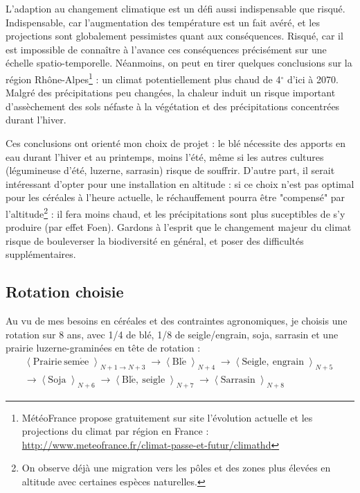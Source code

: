 \documentclass{book}
\begin{document}
L'adaption au changement climatique est un défi aussi indispensable que risqué. Indispensable, car l'augmentation des température est un fait avéré, et les projections sont globalement pessimistes quant aux conséquences. Risqué, car il est impossible de connaître à l'avance ces conséquences précisément sur une échelle spatio-temporelle. Néanmoins, on peut en tirer quelques conclusions sur la région Rhône-Alpes\footnote{MétéoFrance propose gratuitement sur site l'évolution actuelle et les projections du climat par région en France : \url{http://www.meteofrance.fr/climat-passe-et-futur/climathd}} : un climat potentiellement plus chaud de 4$^\circ$ d'ici à 2070. Malgré des précipitations peu changées, la chaleur induit un risque important d'assèchement des sols néfaste à la végétation et des précipitations concentrées durant l'hiver. 

Ces conclusions ont orienté mon choix de projet : le blé nécessite des apports en eau durant l'hiver et au printemps, moins l'été, même si les autres cultures (légumineuse d'été, luzerne, sarrasin) risque de souffrir. D'autre part, il serait intéressant d'opter pour une installation en altitude : si ce choix n'est pas optimal pour les céréales à l'heure actuelle, le réchauffement pourra être "compensé" par l'altitude\footnote{On observe déjà une migration vers les pôles et des zones plus élevées en altitude avec certaines espèces naturelles.} : il fera moins chaud, et les précipitations sont plus suceptibles de s'y produire (par effet Foen). Gardons à l'esprit que le changement majeur du climat risque de bouleverser la biodiversité en général, et poser des difficultés supplémentaires.

\subsection{Rotation choisie}

Au vu de mes besoins en céréales et des contraintes agronomiques, je choisis une rotation sur 8 ans, avec 1/4 de blé, 1/8 de seigle/engrain, soja, sarrasin et une prairie luzerne-graminées en tête de rotation :
\begin{align*}
\left\langle \right. \mathrm{Prairie\ sem\acute{e}e}  \left\rangle \right._{N+1\rightarrow N+3}  \longrightarrow
\left\langle \right. \mathrm{Bl\acute{e}}  \left\rangle \right._{N+4}  
\longrightarrow
\left\langle \right. \mathrm{Seigle,\ engrain}  \left\rangle \right._{N+5} \\
\longrightarrow 
\left\langle \right.\mathrm{Soja}\left\rangle \right._{N+6}
\longrightarrow
\left\langle \right. \mathrm{Bl\acute{e},\ seigle} \left\rangle \right._{N+7}
\longrightarrow
\left\langle \right. \mathrm{Sarrasin} \left\rangle \right._{N+8}
\end{align*}
\end{document}
